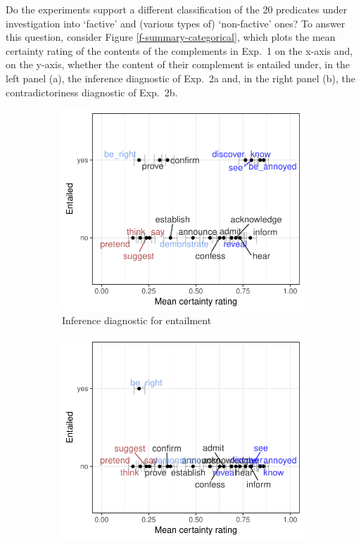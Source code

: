 \documentclass[11pt,fleqn]{article}
\newcommand{\6}{\mbox{$[\hspace*{-.6mm}[$}}
\newcommand{\9}{\mbox{$]\hspace*{-.6mm}]$}}
\begin{document}
{Do the experiments support a different classification of the 20 predicates under investigation into `factive' and (various types of) `non-factive' ones? To answer this question, consider Figure \ref{f-summary-categorical}, which plots the mean certainty rating of the contents of the complements in Exp.~1 on the x-axis and, on the y-axis, whether the content of their complement is entailed under, in the left panel (a), the inference diagnostic of Exp.~2a and, in the right panel (b), the contradictoriness diagnostic of Exp.~2b. 

\begin{figure}[h]

\begin{subfigure}{.5\textwidth}
\centering
\includegraphics[width=.35\paperwidth]{../results/5-projectivity-no-fact/graphs/projection-by-inferenceEntailment}
\caption{Inference diagnostic for entailment}
\end{subfigure}%
\begin{subfigure}{.5\textwidth}
\centering
\includegraphics[width=.35\paperwidth]{../results/5-projectivity-no-fact/graphs/projection-by-contradictorinessEntailment}

\end{subfigure}
\end{figure}}
\end{document}
